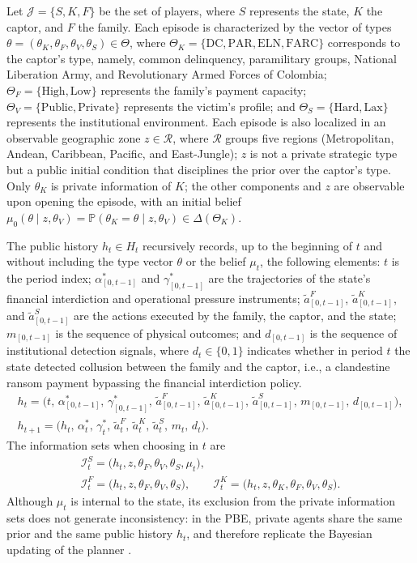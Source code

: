 \documentclass[ecta,nameyear,draft]{econsocart}
\theoremstyle{plain}
\theoremstyle{definition}
\newcommand{\Prob}{\mathbb{P}}
\newcommand{\ThetaK}{\Theta_K}
\newcommand{\1}{\mathbf{1}}
\begin{document}
Let $\mathcal{J}=\{S,K,F\}$ be the set of players, where $S$ represents the state, $K$ the captor, and $F$ the family. Each episode is characterized by the vector of types $\theta=(\theta_K,\theta_F,\theta_V,\theta_S)\in\Theta$, where $\ThetaK=\{\text{DC},\text{PAR},\text{ELN},\text{FARC}\}$ corresponds to the captor's type, namely, common delinquency, paramilitary groups, National Liberation Army, and Revolutionary Armed Forces of Colombia; $\Theta_F=\{\text{High},\text{Low}\}$ represents the family's payment capacity; $\Theta_V=\{\text{Public},\text{Private}\}$ represents the victim's profile; and $\Theta_S=\{\text{Hard},\text{Lax}\}$ represents the institutional environment. Each episode is also localized in an observable geographic zone $z\in\mathcal{R}$, where $\mathcal{R}$ groups five regions (Metropolitan, Andean, Caribbean, Pacific, and East-Jungle); $z$ is not a private strategic type but a public initial condition that disciplines the prior over the captor's type. Only $\theta_K$ is private information of $K$; the other components and $z$ are observable upon opening the episode, with an initial belief $\mu_0(\theta\mid z,\theta_V)=\Prob(\theta_K=\theta\mid z,\theta_V)\in\Delta(\ThetaK)$.


The public history $h_t\in H_t$ recursively records, up to the beginning of $t$ and without including the type vector $\theta$ or the belief $\mu_t$, the following elements: $t$ is the period index; $\alpha^\ast_{[0,t-1]}$ and $\gamma^\ast_{[0,t-1]}$ are the trajectories of the state's financial interdiction and operational pressure instruments; $\tilde{a}^F_{[0,t-1]}$, $\tilde{a}^K_{[0,t-1]}$, and $\tilde{a}^S_{[0,t-1]}$ are the actions executed by the family, the captor, and the state; $m_{[0,t-1]}$ is the sequence of physical outcomes; and $d_{[0,t-1]}$ is the sequence of institutional detection signals, where $d_t\in\{0,1\}$ indicates whether in period $t$ the state detected collusion between the family and the captor, i.e., a clandestine ransom payment bypassing the financial interdiction policy.
\begin{gather}
h_t = \bigl(t,\,\alpha^\ast_{[0,t-1]},\,\gamma^\ast_{[0,t-1]},\,\tilde{a}^F_{[0,t-1]},\,\tilde{a}^K_{[0,t-1]},\,\tilde{a}^S_{[0,t-1]},\,m_{[0,t-1]},\,d_{[0,t-1]}\bigr),\label{eq:historia-publica}\\
h_{t+1} = \bigl(h_t,\,\alpha_t^\ast,\,\gamma_t^\ast,\,\tilde{a}_t^F,\,\tilde{a}_t^K,\,\tilde{a}_t^S,\,m_t,\,d_t\bigr).\label{eq:actualizacion-historia}
\end{gather}
The information sets when choosing in $t$ are
\begin{gather*}
\mathcal{I}_t^S=\bigl(h_t,z,\theta_F,\theta_V,\theta_S,\mu_t\bigr),\\
\mathcal{I}_t^F=\bigl(h_t,z,\theta_F,\theta_V,\theta_S\bigr),\qquad
\mathcal{I}_t^K=\bigl(h_t,z,\theta_K,\theta_F,\theta_V,\theta_S\bigr).
\end{gather*}
Although $\mu_t$ is internal to the state, its exclusion from the private information sets does not generate inconsistency: in the PBE, private agents share the same prior and the same public history $h_t$, and therefore replicate the Bayesian updating of the planner \citet{FudenbergTirole1991}.
\end{document}
